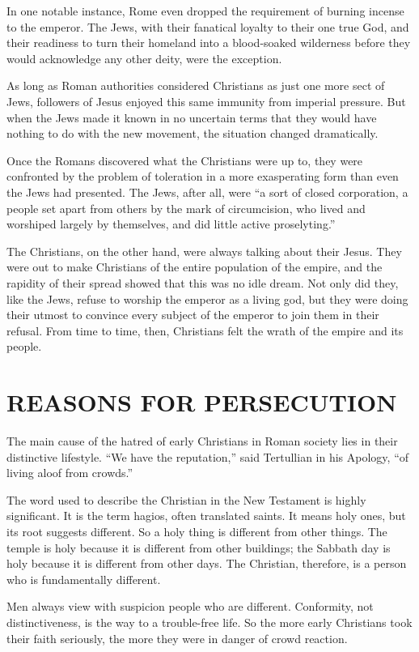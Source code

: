 In one notable instance, Rome even dropped the requirement of burning incense to the emperor. The
Jews, with their fanatical loyalty to their one true God, and their readiness to turn their homeland
into a blood-soaked wilderness before they would acknowledge any other deity, were the exception.

As long as Roman authorities considered Christians as just one more sect of Jews, followers of Jesus
enjoyed this same immunity from imperial pressure. But when the Jews made it known in no uncertain
terms that they would have nothing to do with the new movement, the situation changed dramatically.

Once the Romans discovered what the Christians were up to, they were confronted by the problem of
toleration in a more exasperating form than even the Jews had presented. The Jews, after all, were
“a sort of closed corporation, a people set apart from others by the mark of circumcision, who lived
and worshiped largely by themselves, and did little active proselyting.”

The Christians, on the other hand, were always talking about their Jesus. They were out to make
Christians of the entire population of the empire, and the rapidity of their spread showed that this
was no idle dream. Not only did they, like the Jews, refuse to worship the emperor as a living god,
but they were doing their utmost to convince every subject of the emperor to join them in their
refusal. From time to time, then, Christians felt the wrath of the empire and its people.

\section{REASONS FOR PERSECUTION}

The main cause of the hatred of early Christians in Roman society lies in their distinctive
lifestyle. “We have the reputation,” said Tertullian in his Apology, “of living aloof from crowds.”

The word used to describe the Christian in the New Testament is highly significant. It is the term
hagios, often translated saints. It means holy ones, but its root suggests different. So a holy
thing is different from other things. The temple is holy because it is different from other
buildings; the Sabbath day is holy because it is different from other days. The Christian,
therefore, is a person who is fundamentally different.

Men always view with suspicion people who are different. Conformity, not distinctiveness, is the way
to a trouble-free life. So the more early Christians took their faith seriously, the more they were
in danger of crowd reaction.


